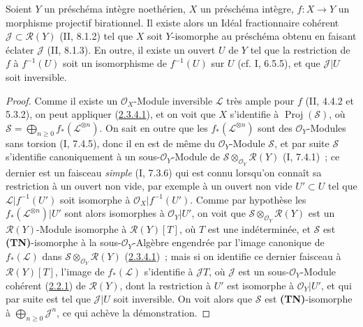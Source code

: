 \begin{proposition}[2.3.5]
\label{III.2.3.5-fr}
Soient $Y$ un préschéma intègre noethérien, $X$ un préschéma intègre,
$f:X\to Y$ un morphisme projectif birationnel. Il existe alors un Idéal
fractionnaire cohérent $\mathcal J\subset\mathcal R(Y)$ (II, 8.1.2) tel
que $X$ soit $Y$-isomorphe au préschéma obtenu en faisant éclater
$\mathcal J$ (II, 8.1.3). En outre, il existe un ouvert $U$ de $Y$ tel que
la restriction de $f$ à $f^{-1}(U)$ soit un isomorphisme de $f^{-1}(U)$
sur $U$ (cf. I, 6.5.5), et que $\mathcal J|U$ soit inversible.
\end{proposition}

\begin{proof}
Comme il existe un $\mathcal O_X$-Module inversible $\mathcal L$ très
ample pour $f$ (II, 4.4.2 et 5.3.2), on peut appliquer
(\hyperref[III.2.3.4.1-fr]{2.3.4.1}), et on voit que $X$ s'identifie à
$\operatorname{Proj}(\mathcal S)$, où
$\mathcal S=\bigoplus_{n\geq0}f_*(\mathcal L^{\otimes n})$. On sait en
outre que les $f_*(\mathcal L^{\otimes n})$ sont des
$\mathcal O_Y$-Modules sans torsion (I, 7.4.5), donc il en est de même du
$\mathcal O_Y$-Module $\mathcal S$, et par suite $\mathcal S$ s'identifie
canoniquement à un sous-$\mathcal O_Y$-Module de
$\mathcal S\otimes_{\mathcal O_Y}\mathcal R(Y)$ (I, 7.4.1)~; ce dernier
est un faisceau \emph{simple} (I, 7.3.6) qui est connu lorsqu'on connaît
sa restriction à un ouvert non vide, par exemple à un ouvert non vide
$U'\subset U$ tel que $\mathcal L|f^{-1}(U')$ soit isomorphe à
$\mathcal O_X|f^{-1}(U')$. Comme par hypothèse les
$f_*(\mathcal L^{\otimes n})|U'$ sont alors isomorphes à
$\mathcal O_Y|U'$, on voit que
$\mathcal S\otimes_{\mathcal O_Y}\mathcal R(Y)$ est un
$\mathcal R(Y)$-Module isomorphe à $\mathcal R(Y)[T]$, où $T$ est une
indéterminée, et $\mathcal S$ est \textbf{(TN)}-isomorphe à la
sous-$\mathcal O_Y$-Algèbre engendrée par l'image canonique de
$f_*(\mathcal L)$ dans $\mathcal S\otimes_{\mathcal O_Y}\mathcal R(Y)$
(\hyperref[III.2.3.4.1-fr]{2.3.4.1})~; mais si on identifie ce dernier
faisceau à $\mathcal R(Y)[T]$, l'image de $f_*(\mathcal L)$ s'identifie à
$\mathcal J T$, où $\mathcal J$ est un sous-$\mathcal O_Y$-Module
cohérent (\hyperref[III.2.2.1-fr]{2.2.1}) de $\mathcal R(Y)$, dont la
restriction à $U'$ est isomorphe à $\mathcal O_Y|U'$, et qui par suite
est tel que $\mathcal J|U$ soit inversible. On voit alors que $\mathcal S$
est \textbf{(TN)}-isomorphe à $\bigoplus_{n\geq0}\mathcal J^n$, ce qui
achève la démonstration.
\end{proof}

